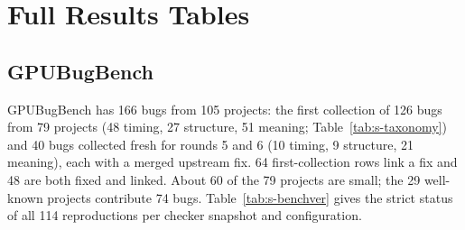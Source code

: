 \documentclass[acmtog,anonymous,review]{acmart}
\newcommand{\bench}{GPUBugBench\xspace}
\begin{document}
\section{Full Results Tables}
\label{sec:eval}

\subsection{\bench}
\bench has 166 bugs from 105 projects: the first collection of 126 bugs from 79 projects (48 timing, 27 structure, 51
meaning; Table~\ref{tab:s-taxonomy}) and 40 bugs collected fresh for rounds 5 and 6 (10 timing, 9 structure, 21
meaning), each with a merged upstream fix. 64 first-collection rows link a fix and 48 are both fixed and linked. About
60 of the 79 projects are small; the 29 well-known projects contribute 74 bugs. Table~\ref{tab:s-benchver} gives the
strict status of all 114 reproductions per checker snapshot and configuration.
\end{document}
